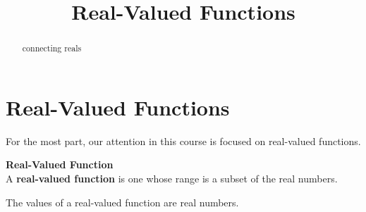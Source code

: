 \documentclass{ximera}
\title{Real-Valued Functions}
\begin{document}
\begin{abstract}
connecting reals
\end{abstract}
\maketitle




\section*{Real-Valued Functions}

For the most part, our attention in this course is focused on real-valued functions.




\begin{definition} \textbf{\textcolor{green!50!black}{Real-Valued Function}} \\

A \textbf{real-valued function} is one whose range is a subset of the real numbers.

\end{definition}
The values of a real-valued function are real numbers.
\end{document}

